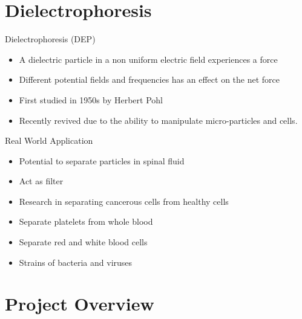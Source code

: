
\subtitle{for Particle Separation in a Fluid}

\date{27 April 2016}




\begin{frame}
  \maketitle
\end{frame}

\section{Dielectrophoresis}

\begin{frame}{Dielectrophoresis (DEP)}
  \begin{itemize}
  \item A dielectric particle in a non uniform 
  electric field experiences a force
  \item Different potential fields and frequencies 
  has an effect on the net force
  \item First studied in 1950s by Herbert Pohl
  \item Recently revived due to the ability to
  manipulate micro-particles and cells. 
  \end{itemize}
\end{frame}

\begin{frame}{Real World Application}
  \begin{itemize}
    \item Potential to separate particles in spinal fluid
    \item Act as filter
    \item Research in separating cancerous cells from healthy cells
    \item Separate platelets from whole blood
    \item Separate red and white blood cells
    \item Strains of bacteria and viruses
  \end{itemize}
\end{frame}

\section{Project Overview}

